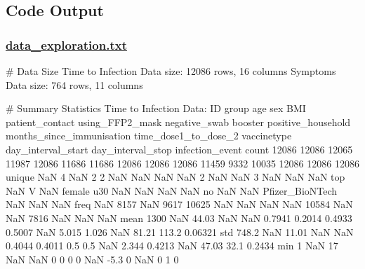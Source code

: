 \documentclass[11pt]{article}
\begin{document}
\subsection{Code Output}\hypertarget{file-data-exploration-txt}{}

\subsubsection*{\hyperlink{code-Data Exploration-data-exploration-txt}{data\_exploration.txt}}

\begin{codeoutput}
\# Data Size
Time to Infection Data size: 12086 rows, 16 columns
Symptoms Data size: 764 rows, 11 columns

\# Summary Statistics
Time to Infection Data:
          ID  group   age     sex    BMI  patient\_contact  using\_FFP2\_mask  negative\_swab  booster positive\_household  months\_since\_immunisation  time\_dose1\_to\_dose\_2      vaccinetype  day\_interval\_start  day\_interval\_stop  infection\_event
count  12086  12086 12065   11987  12086            11686            11686          12086    12086              12086                      11459                  9332            10035               12086              12086            12086
unique   NaN      4   NaN       2      2              NaN              NaN            NaN      NaN                  2                        NaN                   NaN                3                 NaN                NaN              NaN
top      NaN      V   NaN  female    u30              NaN              NaN            NaN      NaN                 no                        NaN                   NaN  Pfizer\_BioNTech                 NaN                NaN              NaN
freq     NaN   8157   NaN    9617  10625              NaN              NaN            NaN      NaN              10584                        NaN                   NaN             7816                 NaN                NaN              NaN
mean    1300    NaN 44.03     NaN    NaN           0.7941           0.2014         0.4933   0.5007                NaN                      5.015                 1.026              NaN               81.21              113.2          0.06321
std    748.2    NaN 11.01     NaN    NaN           0.4044           0.4011            0.5      0.5                NaN                      2.344                0.4213              NaN               47.03               32.1           0.2434
min        1    NaN    17     NaN    NaN                0                0              0        0                NaN                       -5.3                     0              NaN                   0                  1                0

\end{codeoutput}
\end{document}
